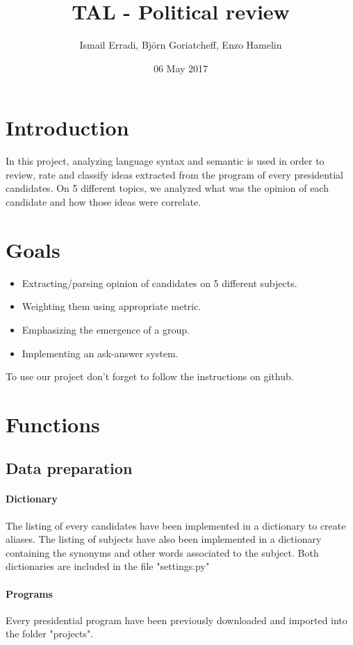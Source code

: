 \documentclass{article}
\title{TAL - Political review}
\author{ Ismail Erradi, Björn Goriatcheff, Enzo Hamelin  }
\date{06 May 2017}
\begin{document}
\maketitle

\section{Introduction}
    In this project, analyzing language syntax and semantic is used in order to review, rate and classify ideas extracted from the program of every presidential candidates. On 5 different topics, we analyzed what was the opinion of each candidate and how those ideas were correlate.
    
\section{Goals}
\begin {itemize}
\item Extracting/parsing opinion of candidates on 5 different subjects.
\item Weighting them using appropriate metric.
\item Emphasizing the emergence of a group.
\item Implementing an ask-answer system.
\end{itemize}

To use our project don't forget to follow the instructions on github.


\section{Functions}
\subsection{Data preparation}
\paragraph{Dictionary}
The listing of every candidates have been implemented in a dictionary to create aliases.
The listing of subjects have also been implemented in a dictionary containing the synonyms and other words associated to the subject.
Both dictionaries are included in the file "settings.py"
\paragraph{Programs}
Every presidential program have been previously downloaded and imported into the folder "projects".
\end{document}
